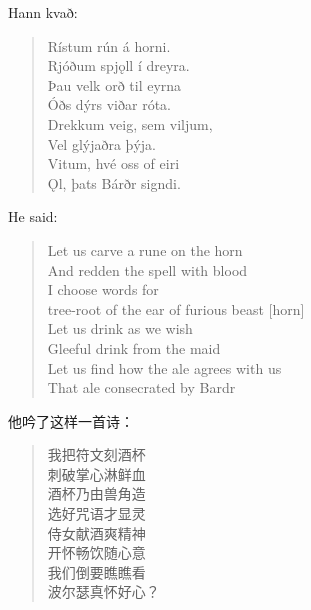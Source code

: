 \begin{paracol}{2}
    Hann kvað:
    \begin{quote}
        Rístum rún á horni.\\
        Rjóðum spjǫll í dreyra.\\
        Þau velk orð til eyrna\\
        Óðs dýrs viðar róta.\\
        Drekkum veig, sem viljum,\\
        Vel glýjaðra þýja.\\
        Vitum, hvé oss of eiri\\
        \MakeUppercase ǫl, þats Bárðr signdi.
    \end{quote}

    \switchcolumn
    He said:
    \begin{quote}
        Let us carve a rune on the horn\\
        And redden the spell with blood\\
        I choose words for \\
        tree-root of the ear of furious beast [horn]\\
        Let us drink as we wish\\
        Gleeful drink from the maid\\
        Let us find how the ale agrees with us\\
        That ale consecrated by Bardr
    \end{quote}

\end{paracol}
\begin{translation*}{}
    他吟了这样一首诗：
    \begin{quote}
        我把符文刻酒杯\\
        刺破掌心淋鲜血\\
        酒杯乃由兽角造\\
        选好咒语才显灵\\
        侍女献酒爽精神\\
        开怀畅饮随心意\\
        我们倒要瞧瞧看\\
        波尔瑟真怀好心？\\
    \end{quote}
\end{translation*}

